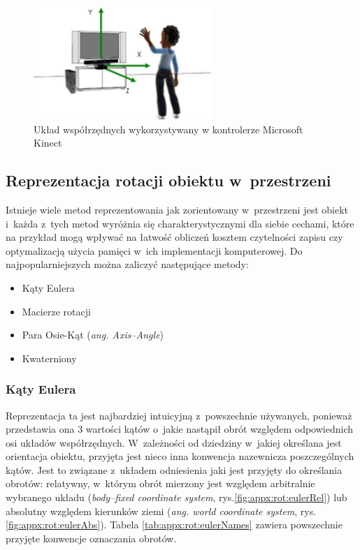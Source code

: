 \begin{figure}
	\centering
	\includegraphics[width=0.6\textwidth]{images/skeletonSpace.png}
	\caption{Układ współrzędnych wykorzystywany w kontrolerze Microsoft Kinect \cite{msdn:kinectCoordSpace2016}}
	\label{fig:characteristics:kinect:space}
\end{figure}
		

\subsection{Reprezentacja rotacji obiektu w~przestrzeni}\label{chap:orientstionRep}
Istnieje wiele metod reprezentowania jak zorientowany w~przestrzeni jest obiekt i~każda z~tych metod wyróżnia się charakterystycznymi dla siebie cechami, które na przykład mogą wpływać na łatwość obliczeń kosztem czytelności zapisu czy optymalizacją użycia pamięci w~ich implementacji komputerowej. Do najpopularniejszych można zaliczyć następujące metody:
	
\begin{itemize}
	\item Kąty Eulera
	\item Macierze rotacji
	\item Para Osie-Kąt (\emph{ang. Axis--Angle})
	\item Kwaterniony
\end{itemize} 
		
\subsubsection*{Kąty Eulera} \label{sec:orientstionRep:euler}
Reprezentacja ta jest najbardziej intuicyjną z~powszechnie używanych, ponieważ przedstawia ona 3 wartości kątów o~jakie nastąpił obrót względem odpowiednich osi układów współrzędnych. W~zależności od dziedziny w~jakiej określana jest orientacja obiektu, przyjęta jest nieco inna konwencja nazewnicza poszczególnych kątów. Jest to związane z~układem odniesienia jaki jest przyjęty do określania obrotów: relatywny, w~którym obrót mierzony jest względem arbitralnie wybranego układu (\emph{body--fixed coordinate system}, rys.\ref{fig:appx:rot:eulerRel}) lub absolutny względem kierunków ziemi (\emph{ang. world coordinate system}, rys.\ref{fig:appx:rot:eulerAbs}). Tabela \ref{tab:appx:rot:eulerNames} zawiera powszechnie przyjęte konwencje oznaczania obrotów.
		
